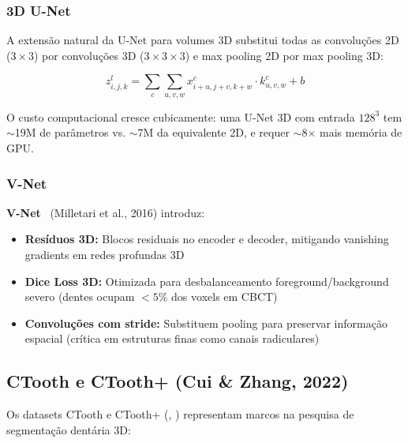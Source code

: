 \subsubsection{3D U-Net}

A extensão natural da U-Net para volumes 3D substitui todas as convoluções 2D
($3 \times 3$) por convoluções 3D ($3 \times 3 \times 3$) e max pooling 2D
por max pooling 3D:

\begin{equation}
  z_{i,j,k}^{l} = \sum_{c} \sum_{u,v,w} x_{i+u, j+v, k+w}^{c} \cdot k_{u,v,w}^{c} + b
  \label{eq:conv3d}
\end{equation}

O custo computacional cresce cubicamente: uma U-Net 3D com entrada $128^3$ tem
$\sim$19M de parâmetros vs. $\sim$7M da equivalente 2D, e requer $\sim$8$\times$
mais memória de GPU.

\subsubsection{V-Net}

\textbf{V-Net}~\cite{milletari2016vnet} (Milletari et al., 2016) introduz:
\begin{itemize}
  \item \textbf{Resíduos 3D:} Blocos residuais no encoder e decoder, mitigando
        vanishing gradients em redes profundas 3D
  \item \textbf{Dice Loss 3D:} Otimizada para desbalanceamento foreground/background
        severo (dentes ocupam $< 5\%$ dos voxels em CBCT)
  \item \textbf{Convoluções com stride:} Substituem pooling para preservar
        informação espacial (crítica em estruturas finas como canais radiculares)
\end{itemize}

\subsection{CTooth e CTooth+ (Cui \& Zhang, 2022)}

Os datasets CTooth e CTooth+ (, )
representam marcos na pesquisa de segmentação dentária 3D:

